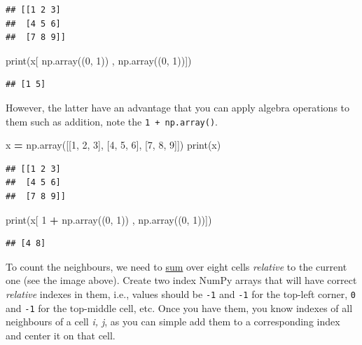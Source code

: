 \documentclass[
]{book}
\newenvironment{Shaded}{\begin{snugshade}}{\end{snugshade}}
\newcommand{\BuiltInTok}[1]{#1}
\newcommand{\DecValTok}[1]{\textcolor[rgb]{0.00,0.00,0.81}{#1}}
\newcommand{\NormalTok}[1]{#1}
\newcommand{\OperatorTok}[1]{\textcolor[rgb]{0.81,0.36,0.00}{\textbf{#1}}}
\begin{document}
\begin{verbatim}
## [[1 2 3]
##  [4 5 6]
##  [7 8 9]]
\end{verbatim}

\begin{Shaded}
\begin{Highlighting}[]
\BuiltInTok{print}\NormalTok{(x[ np.array((}\DecValTok{0}\NormalTok{, }\DecValTok{1}\NormalTok{)) , np.array((}\DecValTok{0}\NormalTok{, }\DecValTok{1}\NormalTok{))])}
\end{Highlighting}
\end{Shaded}

\begin{verbatim}
## [1 5]
\end{verbatim}

However, the latter have an advantage that you can apply algebra operations to them such as addition, note the \texttt{1\ +\ np.array()}.

\begin{Shaded}
\begin{Highlighting}[]
\NormalTok{x }\OperatorTok{=}\NormalTok{ np.array([[}\DecValTok{1}\NormalTok{, }\DecValTok{2}\NormalTok{, }\DecValTok{3}\NormalTok{], [}\DecValTok{4}\NormalTok{, }\DecValTok{5}\NormalTok{, }\DecValTok{6}\NormalTok{], [}\DecValTok{7}\NormalTok{, }\DecValTok{8}\NormalTok{, }\DecValTok{9}\NormalTok{]])}
\BuiltInTok{print}\NormalTok{(x)}
\end{Highlighting}
\end{Shaded}

\begin{verbatim}
## [[1 2 3]
##  [4 5 6]
##  [7 8 9]]
\end{verbatim}

\begin{Shaded}
\begin{Highlighting}[]
\BuiltInTok{print}\NormalTok{(x[ }\DecValTok{1} \OperatorTok{+}\NormalTok{ np.array((}\DecValTok{0}\NormalTok{, }\DecValTok{1}\NormalTok{)) , np.array((}\DecValTok{0}\NormalTok{, }\DecValTok{1}\NormalTok{))])}
\end{Highlighting}
\end{Shaded}

\begin{verbatim}
## [4 8]
\end{verbatim}

To count the neighbours, we need to \href{https://numpy.org/doc/stable/reference/generated/numpy.sum.html}{sum} over eight cells \emph{relative} to the current one (see the image above). Create two index NumPy arrays that will have correct \emph{relative} indexes in them, i.e., values should be \texttt{-1} and \texttt{-1} for the top-left corner, \texttt{0} and \texttt{-1} for the top-middle cell, etc. Once you have them, you know indexes of all neighbours of a cell \emph{i, j}, as you can simple add them to a corresponding index and center it on that cell.
\end{document}
